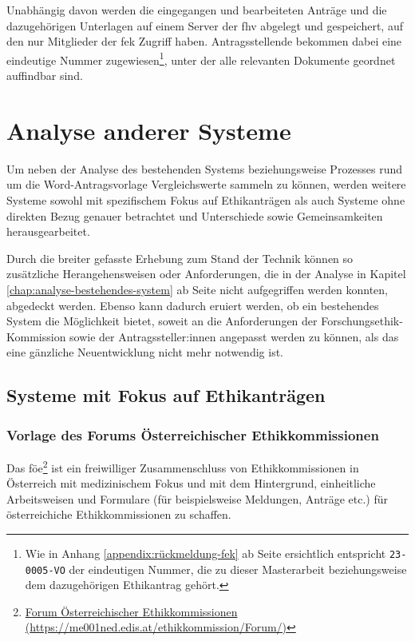 \documentclass[a4paper,12pt,twoside]{scrreprt}
\begin{document}
Unabhängig davon werden die eingegangen und bearbeiteten Anträge und die dazugehörigen Unterlagen auf einem Server der \acl{fhv} abgelegt und gespeichert, auf den nur Mitglieder der \ac{fek} Zugriff haben. Antragsstellende bekommen dabei eine eindeutige Nummer zugewiesen\footnote{Wie in Anhang \ref{appendix:rückmeldung-fek} ab Seite \pageref{appendix:rückmeldung-fek} ersichtlich entspricht \texttt{23-0005-VO} der eindeutigen Nummer, die zu dieser Masterarbeit beziehungsweise dem dazugehörigen Ethikantrag gehört.}, unter der alle relevanten Dokumente geordnet auffindbar sind.

\chapter{Analyse anderer Systeme}
\label{chap:analyse-anderer-systeme}

Um neben der Analyse des bestehenden Systems beziehungsweise Prozesses rund um die Word-Antragsvorlage Vergleichswerte sammeln zu können, werden weitere Systeme sowohl mit spezifischem Fokus auf Ethikanträgen als auch Systeme ohne direkten Bezug genauer betrachtet und Unterschiede sowie Gemeinsamkeiten herausgearbeitet.

Durch die breiter gefasste Erhebung zum Stand der Technik können so zusätzliche Herangehensweisen oder Anforderungen, die in der Analyse in Kapitel \ref{chap:analyse-bestehendes-system} ab Seite \pageref{chap:analyse-anderer-systeme} nicht aufgegriffen werden konnten, abgedeckt werden. Ebenso kann dadurch eruiert werden, ob ein bestehendes System die Möglichkeit bietet, soweit an die Anforderungen der Forschungsethik-Kommission sowie der Antragssteller:innen angepasst werden zu können, als das eine gänzliche Neuentwicklung nicht mehr notwendig ist.

\section{Systeme mit Fokus auf Ethikanträgen}
\label{sec:systeme-mit-fokkus-ethikantrage}

\subsection{Vorlage des Forums Österreichischer Ethikkommissionen}
\label{sub-sec:vorlage-föe}

Das \ac{föe}\footnote{\href{https://me001ned.edis.at/ethikkommission/Forum/index.htm}{Forum Österreichischer Ethikkommissionen (\url{https://me001ned.edis.at/ethikkommission/Forum/)}}} ist ein freiwilliger Zusammenschluss von Ethikkommissionen in Österreich mit medizinischem Fokus und mit dem Hintergrund, einheitliche Arbeitsweisen und Formulare (für beispielsweise Meldungen, Anträge etc.) für österreichiche Ethikkommissionen zu schaffen. \cite{ethikkommission_der_medizinischen_universitat_graz_forum_2019}
\end{document}
